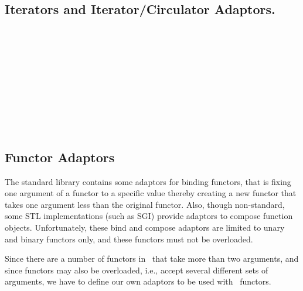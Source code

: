 \\
\\
\\

\subsection*{Iterators and Iterator/Circulator Adaptors.}

\\
\\
\\
\\
\\
\\
\\
\\
\\

\subsection*{Functor Adaptors}

The standard library contains some adaptors for binding functors, that
is fixing one argument of a functor to a specific value thereby
creating a new functor that takes one argument less than the original
functor.  Also, though non-standard, some STL implementations (such as
SGI) provide adaptors to compose function objects. Unfortunately,
these bind and compose adaptors are limited to unary and binary
functors only, and these functors must not be overloaded.

Since there are a number of functors in \cgal\ that take more than two
arguments, and since functors may also be overloaded, i.e., accept
several different sets of arguments, we have to define our own
adaptors to be used with \cgal\ functors.

